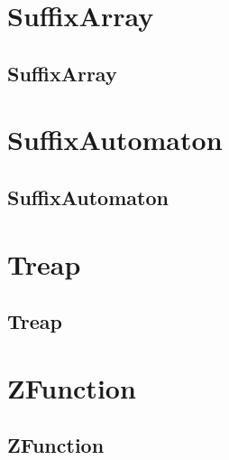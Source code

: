 \documentclass[a4paper, twocolumn]{article}
\begin{document}
\section{SuffixArray}
\subsection{SuffixArray}

\section{SuffixAutomaton}
\subsection{SuffixAutomaton}

\section{Treap}
\subsection{Treap}

\section{ZFunction}
\subsection{ZFunction}

\end{document}
